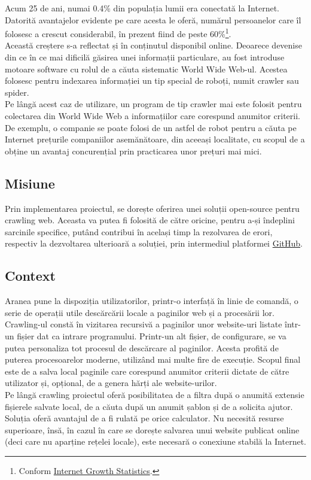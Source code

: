 \documentclass[12pt]{article}
\begin{document}
Acum 25 de ani, numai 0.4\% din populația lumii era conectată la Internet. Datorită avantajelor evidente pe care acesta le oferă, numărul persoanelor care îl folosesc a crescut considerabil, în prezent fiind de peste 60\%\footnote{Conform  \href{https://www.internetworldstats.com/emarketing.htm}{Internet Growth Statistics}.}. \\
Această creștere s-a reflectat și în conținutul disponibil online. Deoarece devenise din ce în ce mai dificilă găsirea unei informații particulare, au fost introduse motoare software cu rolul de a căuta sistematic World Wide Web-ul. Acestea folosesc pentru indexarea informației un tip special de roboți, numit crawler sau spider. \\
Pe lângă acest caz de utilizare, un program de tip crawler mai este folosit pentru colectarea din World Wide Web a informațiilor care corespund anumitor criterii. De exemplu, o companie se poate folosi de un astfel de robot pentru a căuta pe Internet prețurile companiilor asemănătoare, din aceeași localitate, cu scopul de a obține un avantaj concurențial prin practicarea unor prețuri mai mici.

\subsection{Misiune}

Prin implementarea proiectul, se dorește oferirea unei soluții open-source pentru crawling web. Aceasta va putea fi folosită de către oricine, pentru a-și îndeplini sarcinile specifice, putând contribui în același timp la rezolvarea de erori, respectiv la dezvoltarea ulterioară a soluției, prin intermediul platformei \href{https://github.com/}{GitHub}.

\subsection{Context}

Aranea pune la dispoziția utilizatorilor, printr-o interfață în linie de comandă, o serie de operații utile descărcării locale a paginilor web și a procesării lor. \\
Crawling-ul constă în vizitarea recursivă a paginilor unor website-uri listate într-un fișier dat ca intrare programului. Printr-un alt fișier, de configurare, se va putea personaliza tot procesul de descărcare al paginilor. Acesta profită de puterea procesoarelor moderne, utilizând mai multe fire de execuție. Scopul final este de a salva local paginile care corespund anumitor criterii dictate de către utilizator și, opțional, de a genera hărți ale website-urilor. \\
Pe lângă crawling proiectul oferă posibilitatea de a filtra după o anumită extensie fișierele salvate local, de a căuta după un anumit șablon și de a solicita ajutor. \\
Soluția oferă avantajul de a fi rulată pe orice calculator. Nu necesită resurse superioare, însă, în cazul în care se dorește salvarea unui website publicat online (deci care nu aparține rețelei locale), este necesară o conexiune stabilă la Internet.
\end{document}
